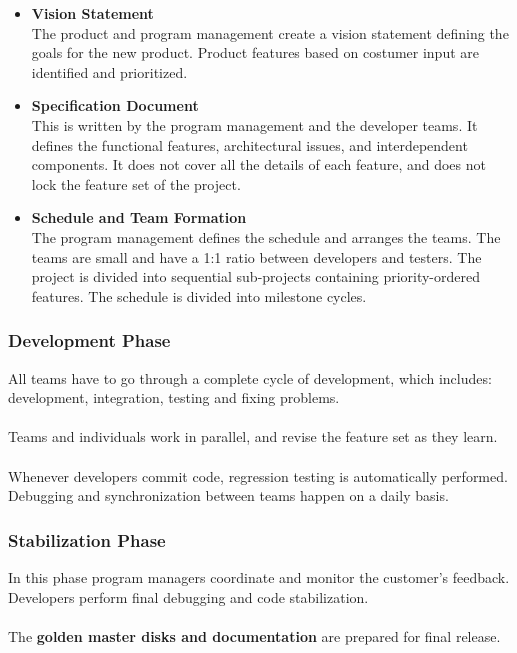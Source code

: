 \documentclass{article}
\begin{document}
\begin{itemize}
	\item \textbf{Vision Statement}
	\vspace{.2cm} \\
	The product and program management create a vision statement defining the goals for the new product. Product features based on costumer input are identified and prioritized.
	
	\item \textbf{Specification Document}
	\vspace{.2cm} \\
	This is written by the program management and the developer teams. It defines the functional features, architectural issues, and interdependent components. It does not cover all the details of each feature, and does not lock the feature set of the project.
	
	\item \textbf{Schedule and Team Formation}
	\vspace{.2cm} \\
	The program management defines the schedule and arranges the teams. The teams are small and have a 1:1 ratio between developers and testers. The project is divided into sequential sub-projects containing priority-ordered features. The schedule is divided into milestone cycles.
\end{itemize}

\subsubsection{Development Phase}
All teams have to go through a complete cycle of development, which includes: development, integration, testing and fixing problems. \\ \\
Teams and individuals work in parallel, and revise the feature set as they learn. \\ \\
Whenever developers commit code, regression testing is automatically performed. Debugging and synchronization between teams happen on a daily basis.

\subsubsection{Stabilization Phase}
In this phase program managers coordinate and monitor the customer's feedback. Developers perform final debugging and code stabilization. \\ \\
The \textbf{golden master disks and documentation} are prepared for final release.
\end{document}
